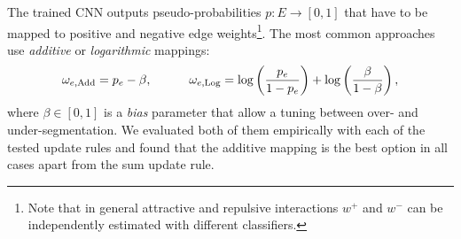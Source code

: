 The trained CNN outputs pseudo-probabilities $p:E \rightarrow [0,1]$ that have to be mapped to positive and negative edge weights\footnote{Note that in general attractive and repulsive interactions $w^+$ and $w^-$ can be independently estimated with different classifiers.}. The most common approaches use \emph{additive} \cite{ailon2008aggregating} or \emph{logarithmic} \cite{finkel2008enforcing,andres2012globally} mappings:
\begin{equation}
\omega_{e,\mathrm{Add}} = p_e - \beta, \qquad \quad \omega_{e,\mathrm{Log}} = \log \left( \frac{p_e}{1-p_e} \right) + \log \left( \frac{\beta}{1-\beta} \right),
\end{equation}
where $\beta \in [0,1]$ is a \emph{bias} parameter that allow a tuning between over- and under-segmentation. We evaluated both of them empirically with each of the tested update rules and found that the additive mapping is the best option in all cases apart from the sum update rule. 
